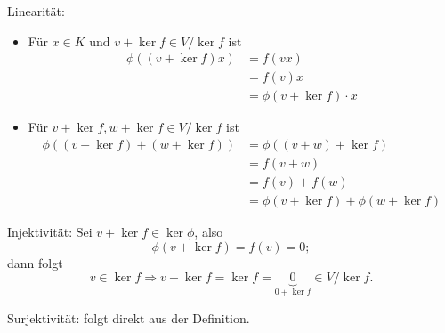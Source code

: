	Linearität:
		\begin{itemize}
		\item Für $ x\in K $ und $ v+\ker f \in V/\ker f $ ist
		\begin{align*}
		\phi( (v+\ker f)x) &= f(vx)\\
                                   &= f(v)x \\
                                   &= \phi (v+\ker f)\cdot x
		\end{align*}
		\item Für $ v+\ker f, w+\ker f\in V/\ker f $ ist 
			\begin{align*}
			\phi ((v+\ker f)+(w+\ker f) ) &= \phi((v+w)+\ker f) \\
			&=f(v+w)\\
			&= f(v)+f(w)\\
			&=\phi(v+\ker f)+\phi(w+\ker f)
			\end{align*}
		\end{itemize}
	Injektivität:
	Sei $ v+\ker f\in \ker \phi $, also 
		\[ \phi(v+\ker f)= f(v) = 0; \]
	dann folgt
		\[ v\in \ker f \Rightarrow v+\ker f = \ker f = \underbrace{0}_{0+\ker f}\in V/\ker f. \]
	
	Surjektivität:
	folgt direkt aus der Definition.		